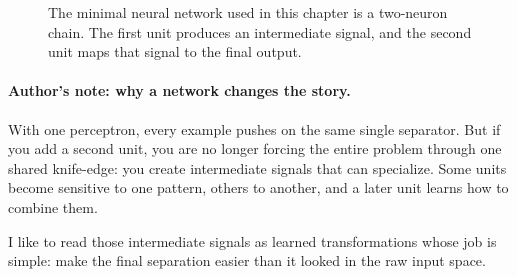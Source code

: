 \begin{figure}[t]
    \centering
    \caption{The minimal neural network used in this chapter is a two-neuron chain. The first unit produces an intermediate signal, and the second unit maps that signal to the final output.}
    \label{fig:mlp_minimal_chain}
\end{figure}

\paragraph{Author's note: why a network changes the story.}
With one perceptron, every example pushes on the same single separator. But if you add a second unit, you are no longer forcing the entire problem through one shared knife-edge: you create intermediate signals that can specialize. Some units become sensitive to one pattern, others to another, and a later unit learns how to combine them.

I like to read those intermediate signals as learned transformations whose job is simple: make the final separation easier than it looked in the raw input space.

